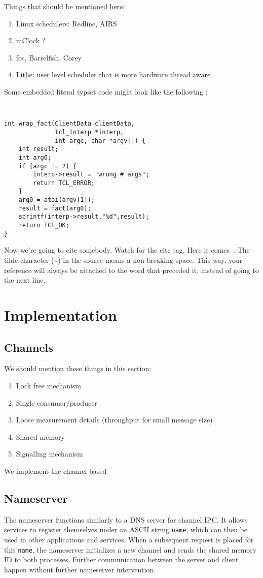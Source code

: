 \documentclass[letterpaper,twocolumn,10pt]{article}
\begin{document}
Things that should be mentioned here:
\begin{enumerate}
\item Linux schedulers: Redline, AIRS
\item mClock ?
\item fos, Barrelfish, Corey
\item Lithe: user level scheduler that is more hardware thread aware
\end{enumerate}

Some embedded literal typset code might 
look like the following :

{\tt \small
\begin{verbatim}
int wrap_fact(ClientData clientData,
              Tcl_Interp *interp,
              int argc, char *argv[]) {
    int result;
    int arg0;
    if (argc != 2) {
        interp->result = "wrong # args";
        return TCL_ERROR;
    }
    arg0 = atoi(argv[1]);
    result = fact(arg0);
    sprintf(interp->result,"%d",result);
    return TCL_OK;
}
\end{verbatim}
}

Now we're going to cite somebody.  Watch for the cite tag.
Here it comes~\cite{Chaum1981,Diffie1976}.  The tilde character (\~{})
in the source means a non-breaking space.  This way, your reference will
always be attached to the word that preceded it, instead of going to the
next line.

\section{Implementation}
\subsection{Channels}
We should mention these things in this section:
\begin{enumerate}
\item Lock free mechanism
\item Single consumer/producer
\item Loose measurement details (throughput for small message size)
\item Shared memory
\item Signalling mechanism
\end{enumerate}

We implement the channel based 

\subsection{Nameserver} %
The nameserver functions similarly to a DNS server for channel IPC. It allows services to register themselves under an ASCII string {\tt name}, which can then be used in other applications and services. When a subsequent request is placed for this {\tt name}, the nameserver initializes a new channel and sends the shared memory ID to both processes. Further communication between the server and client happen without further nameserver intervention.
\end{document}
